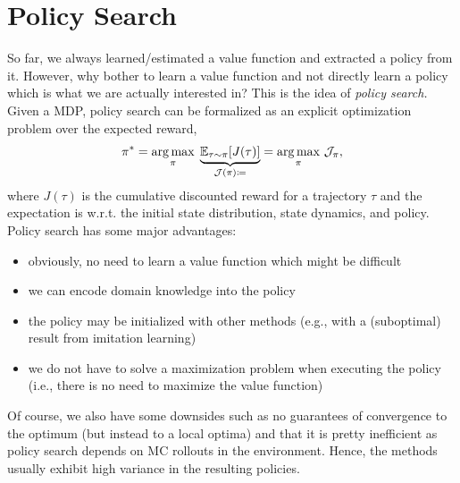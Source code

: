 \chapter{Policy Search}
	So far, we always learned/estimated a value function and extracted a policy from it. However, why bother to learn a value function and not directly learn a policy which is what we are actually interested in? This is the idea of \emph{policy search.} Given a \ac{MDP}, policy search can be formalized as an explicit optimization problem over the expected reward,
	\begin{equation}
		\pi^\ast
			= \operatorname*{arg\,max}_\pi \; \underbrace{\mathbb{E}_{\tau \sim \pi}[J(\tau)]}_{\mathcal{J}(\pi) \coloneqq}
			= \operatorname*{arg\,max}_\pi \, \mathcal{J}_\pi,
		\label{eq:policySearchOptPart}
	\end{equation}
	where \(J(\tau)\) is the cumulative discounted reward for a trajectory \(\tau\) and the expectation is w.r.t. the initial state distribution, state dynamics, and policy. Policy search has some major advantages:
	\begin{itemize}
		\item obviously, no need to learn a value function which might be difficult
		\item we can encode domain knowledge into the policy
		\item the policy may be initialized with other methods (e.g., with a (suboptimal) result from imitation learning)
		\item we do not have to solve a maximization problem when executing the policy (i.e., there is no need to maximize the value function)
	\end{itemize}
	Of course, we also have some downsides such as no guarantees of convergence to the optimum (but instead to a local optima) and that it is pretty inefficient as policy search depends on \ac{MC} rollouts in the environment. Hence, the methods usually exhibit high variance in the resulting policies.

